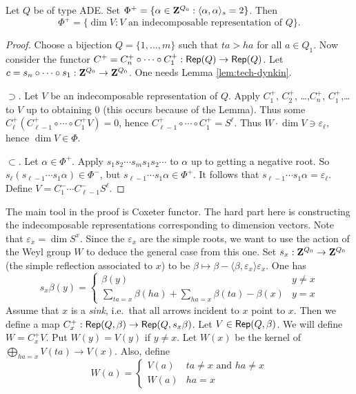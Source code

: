 \documentclass{article}
\begin{document}
\begin{theorem}
Let $Q$ be of type ADE. Set 
$\Phi^+=\{\alpha\in \mathbf{Z}^{Q_0}:\langle \alpha,\alpha\rangle_s = 2\}$. Then 
\[
  \Phi^+=\{\dim V:V\text{ an indecomposable representation of }Q\} .
\] 
\end{theorem}
\begin{proof}
Choose a bijection \(Q=\{1,\dots,m\}\) such that \(t a>h a\) for all 
\(a\in Q_1\). Now consider the functor 
\(C^+=C_n^+ \circ \cdots \circ C_1^+:\operatorname{\mathsf{Rep}}(Q) \to \operatorname{\mathsf{Rep}}(Q)\). 
Let \(c=s_n\circ \cdots \circ s_1:\mathbf{Z}^{Q_0}\to \mathbf{Z}^{Q_0}\). One needs Lemma 
\ref{lem:tech-dynkin}. 

$\supset$. Let \(V\) be an indecomposable representation of \(Q\). Apply 
\(C_1^+\), \(C_2^+\), \ldots,\(C_n^+\), \(C_1^+\),\ldots to \(V\) up to obtaining 
\(0\) (this occurs because of the Lemma). Thus some 
\(C_\ell^+(C_{\ell-1}^+ \circ \cdots \circ C_1^+ V)=0\), hence 
\(C_{\ell-1}^+ \circ \cdots \circ C_1^+ = S^\ell\). Thus 
\(W\cdot \dim V\ni \varepsilon_\ell\), hence 
\(\dim V\in \Phi\). 

\(\subset\). Let \(\alpha\in \Phi^+\). Apply \(s_1 s_2 \dotsm s_m s_1 s_2 \dotsm\) 
to \(\alpha\) up to getting a negative root. So 
\(s_\ell(s_{\ell-1} \dotsm s_1 \alpha)\in \Phi^-\), but 
\(s_{\ell-1} \dotsm s_1 \alpha\in \Phi^+\). It follows that 
\(s_{\ell-1} \dotsm s_1 \alpha=\varepsilon_\ell\). Define 
\(V=C_1^- \dotsm C_{\ell-1}^- S^\ell\). 
\end{proof}

The main tool in the proof is Coxeter functor. The hard part here is constructing 
the indecomposable representations corresponding to dimension vectors. Note that 
$\varepsilon_x = \dim S^x$. Since the $\varepsilon_x$ are the simple roots, we 
want to use the action of the Weyl group $W$ to deduce the general case from this 
one. Set $s_x:\mathbf{Z}^{Q_0} \to \mathbf{Z}^{Q_0}$ (the simple reflection associated to $x$) 
to be $\beta\mapsto \beta-\langle \beta,\varepsilon_x\rangle \varepsilon_x$. One 
has 
\[
  s_x\beta(y) = 
  \begin{cases}
    \beta(y) & y\ne x \\
    \sum_{t a=x} \beta(h a) + \sum_{h a=x} \beta(t a)-\beta(x) & y=x
  \end{cases}
\]
Assume that $x$ is a \emph{sink}, i.e.\ that all arrows incident to $x$ point 
to $x$. Then we define a map 
$C_x^+:\operatorname{\mathsf{Rep}}(Q,\beta) \to \operatorname{\mathsf{Rep}}(Q,s_x\beta)$. 
Let $V\in \operatorname{\mathsf{Rep}}(Q,\beta)$. We will define $W=C_x^+ V$. Put 
$W(y)=V(y)$ if $y\ne x$. Let $W(x)$ be the kernel of 
$\bigoplus_{h a=x} V(t a) \to V(x)$. Also, define 
\[
  W(a) = 
  \begin{cases}
    V(a) & t a\ne x\text{ and }h a\ne x \\
    W(a) & ha =x
  \end{cases}
\]
\end{document}
